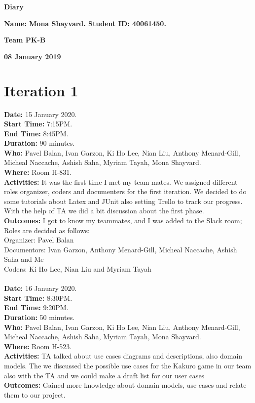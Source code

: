 \documentclass[12pt]{article}
\begin{document}
\vspace*{0.2in}
\centerline{\bf\Large Diary}

\vspace*{0.2in}
\centerline{\bf\Large Name: Mona Shayvard.  Student ID: 40061450.}

\vspace*{0.2in}
\centerline{\bf\Large Team PK-B}

\vspace*{0.2in}
\centerline{\bf\Large 08 January 2019}

\section{Iteration 1}
{\bf Date:} 15 January 2020. \\
{\bf Start Time:} 7:15PM. \\
{\bf End Time:} 8:45PM. \\
{\bf Duration:} 90 minutes. \\
{\bf Who:} Pavel Balan, Ivan Garzon, Ki Ho Lee, Nian Liu, Anthony Menard-Gill, \\
\hspace{10mm} Micheal Naccache, Ashish Saha, Myriam Tayah, Mona Shayvard. \\
{\bf Where:} Room H-831. \\
{\bf Activities:} It was the first time I met my team mates. We assigned different roles organizer, coders and documenters for the first iteration. We decided to do some tutorials about Latex and JUnit also setting Trello to track our progress. With the help of TA we did a bit discussion about the first phase. \\
{\bf Outcomes:} I got to know my teammates, and I was added to the Slack room; Roles are decided as follows: \\
Organizer: Pavel Balan \\
Documentors: Ivan Garzon, Anthony Menard-Gill, Micheal Naccache, Ashish Saha and Me \\
Coders: Ki Ho Lee, Nian Liu and Myriam Tayah \\
\vspace*{0.2in} \\
{\bf Date:} 16 January 2020. \\
{\bf Start Time:} 8:30PM. \\
{\bf End Time:} 9:20PM. \\
{\bf Duration:} 50 minutes. \\
{\bf Who:} Pavel Balan, Ivan Garzon, Ki Ho Lee, Nian Liu, Anthony Menard-Gill, \\
\hspace{10mm} Micheal Naccache, Ashish Saha, Myriam Tayah, Mona Shayvard. \\
{\bf Where:} Room H-523. \\
{\bf Activities:} TA talked about  use cases diagrams and descriptions, also domain models. The we discussed the possible use cases for the Kakuro game in our team also with the TA and we could make a draft list for our user cases \\
{\bf Outcomes:} Gained more knowledge about domain models, use cases and relate them to our project.\\
\end{document}
